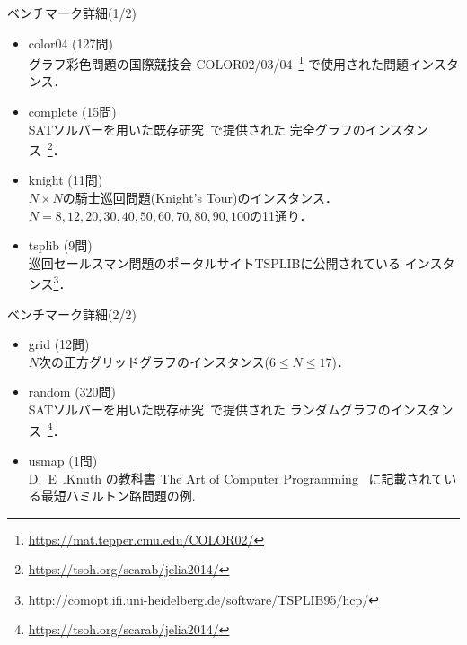 \documentclass[dvipdfmx,11pt]{beamer}
\begin{document}
\begin{frame}[noframenumbering]{ベンチマーク詳細(1/2)}
\begin{itemize}
\item \textsf{color04} (127問)\\
  グラフ彩色問題の国際競技会
  COLOR02/03/04~\footnote{\url{https://mat.tepper.cmu.edu/COLOR02/}}
  で使用された問題インスタンス．
\item \textsf{complete} (15問)\\
  SATソルバーを用いた既存研究~\cite{soh14:jelia2014}で提供された
  完全グラフのインスタンス~\footnote{\url{https://tsoh.org/scarab/jelia2014/}}．
\item \textsf{knight} (11問)\\
  $N\times N$の騎士巡回問題(Knight's Tour)のインスタンス．\\
  $N=8,12,20,30,40,50,60,70,80,90,100$の11通り．
\item \textsf{tsplib} (9問)\\
  巡回セールスマン問題のポータルサイトTSPLIBに公開されている
  インスタンス\footnote{\url{http://comopt.ifi.uni-heidelberg.de/software/TSPLIB95/hcp/}}．
\end{itemize}  
\end{frame}

\begin{frame}[noframenumbering]{ベンチマーク詳細(2/2)}
\begin{itemize}
\item \textsf{grid} (12問)\\
  $N$次の正方グリッドグラフのインスタンス($6\leq N\leq 17$)．
\item \textsf{random} (320問)\\
  SATソルバーを用いた既存研究~\cite{soh14:jelia2014}で提供された
  ランダムグラフのインスタンス~\footnote{\url{https://tsoh.org/scarab/jelia2014/}}．
\item \textsf{usmap} (1問)\\
  D.~E~.Knuth の教科書
  The Art of Computer Programming~\cite{Knuth:TAOCP:SAT}
  に記載されている最短ハミルトン路問題の例.
\end{itemize}
\end{frame}
\end{document}

